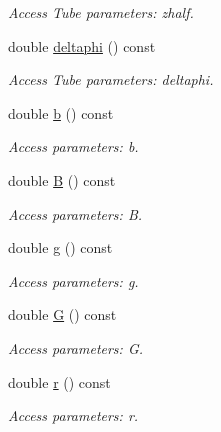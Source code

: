 \begin{DoxyCompactItemize}
\begin{DoxyCompactList}\small\item\em Access Tube parameters: zhalf. \item\end{DoxyCompactList}\item 
double \hyperlink{struct_d_d4hep_1_1_x_m_l_1_1_child_value_a8818734b0188c7c2f6169950c107c5e0}{deltaphi} () const 
\begin{DoxyCompactList}\small\item\em Access Tube parameters: deltaphi. \item\end{DoxyCompactList}\item 
double \hyperlink{struct_d_d4hep_1_1_x_m_l_1_1_child_value_a701852719ab1dad71e2b90bb92d67e84}{b} () const 
\begin{DoxyCompactList}\small\item\em Access parameters: b. \item\end{DoxyCompactList}\item 
double \hyperlink{struct_d_d4hep_1_1_x_m_l_1_1_child_value_a2516147098ab12b0e0f1b3c9990da43d}{B} () const 
\begin{DoxyCompactList}\small\item\em Access parameters: B. \item\end{DoxyCompactList}\item 
double \hyperlink{struct_d_d4hep_1_1_x_m_l_1_1_child_value_a90471efd9069260ab44b90cc142d0aed}{g} () const 
\begin{DoxyCompactList}\small\item\em Access parameters: g. \item\end{DoxyCompactList}\item 
double \hyperlink{struct_d_d4hep_1_1_x_m_l_1_1_child_value_aaaf4536acd36cc1d9ec28b96be43a2a9}{G} () const 
\begin{DoxyCompactList}\small\item\em Access parameters: G. \item\end{DoxyCompactList}\item 
double \hyperlink{struct_d_d4hep_1_1_x_m_l_1_1_child_value_a9b689b155cc4f4e35970bbc652bf33ec}{r} () const 
\begin{DoxyCompactList}\small\item\em Access parameters: r. \item\end{DoxyCompactList}\item 

\end{DoxyCompactItemize}
